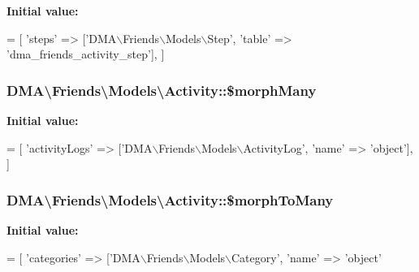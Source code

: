 {\bfseries Initial value\-:}
\begin{DoxyCode}
= [
        \textcolor{stringliteral}{'steps'} => [\textcolor{stringliteral}{'DMA\(\backslash\)Friends\(\backslash\)Models\(\backslash\)Step'}, \textcolor{stringliteral}{'table'} => \textcolor{stringliteral}{'dma\_friends\_activity\_step'}],
    ]
\end{DoxyCode}
\hypertarget{classDMA_1_1Friends_1_1Models_1_1Activity_a192fdaacf609961b7a436d2b967dfd60}{
\subsubsection[{\$morph\-Many}]{\setlength{\rightskip}{0pt plus 5cm}D\-M\-A\textbackslash{}\-Friends\textbackslash{}\-Models\textbackslash{}\-Activity\-::\$morph\-Many}}\label{classDMA_1_1Friends_1_1Models_1_1Activity_a192fdaacf609961b7a436d2b967dfd60}
{\bfseries Initial value\-:}
\begin{DoxyCode}
= [ 
        \textcolor{stringliteral}{'activityLogs'}  => [\textcolor{stringliteral}{'DMA\(\backslash\)Friends\(\backslash\)Models\(\backslash\)ActivityLog'}, \textcolor{stringliteral}{'name'} => \textcolor{stringliteral}{'object'}],
    ]
\end{DoxyCode}
\hypertarget{classDMA_1_1Friends_1_1Models_1_1Activity_a5cfb1d646716be755dcdb6ddb3ab16b1}{
\subsubsection[{\$morph\-To\-Many}]{\setlength{\rightskip}{0pt plus 5cm}D\-M\-A\textbackslash{}\-Friends\textbackslash{}\-Models\textbackslash{}\-Activity\-::\$morph\-To\-Many}}\label{classDMA_1_1Friends_1_1Models_1_1Activity_a5cfb1d646716be755dcdb6ddb3ab16b1}
{\bfseries Initial value\-:}
\begin{DoxyCode}
= [
        \textcolor{stringliteral}{'categories'}    => [\textcolor{stringliteral}{'DMA\(\backslash\)Friends\(\backslash\)Models\(\backslash\)Category'}, \textcolor{stringliteral}{'name'} => \textcolor{stringliteral}{'object'}
\end{DoxyCode}
